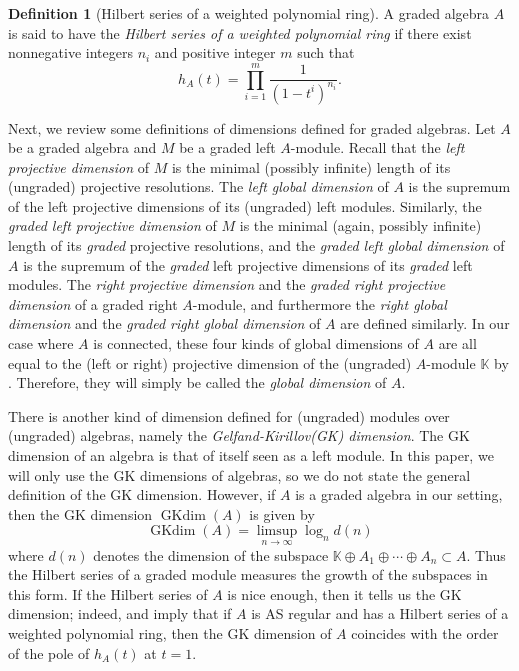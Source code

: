 \documentclass[reqno]{amsart}
\newcommand{\bbK}{\mathbb{K}}
\DeclareMathOperator{\gk}{GKdim}
\numberwithin{equation}{section}
\theoremstyle{plain}
\theoremstyle{definition}
\newtheorem{de}[equation]{Definition}
\begin{document}
\begin{de}[Hilbert series of a weighted polynomial ring]\label{weighted}\cite[Definition 2.3]{Kabbaj}
    A graded algebra $A$ is said to have the \emph{Hilbert series of a weighted polynomial ring} if there exist nonnegative integers $n_i$ and positive integer $m$ such that
    $$h_A(t)=\prod_{i=1}^m\frac{1}{(1-t^i)^{n_i}}.$$
\end{de}

Next, we review some definitions of dimensions defined for graded algebras. Let $A$ be a graded algebra and $M$ be a graded left $A$-module. Recall that the \emph{left projective dimension} of $M$ is the minimal (possibly infinite) length of its (ungraded) projective resolutions. The \emph{left global dimension} of $A$ is the supremum of the left projective dimensions of its (ungraded) left modules. Similarly, the \emph{graded left projective dimension} of $M$ is the minimal (again, possibly infinite) length of its \emph{graded} projective resolutions, and the \emph{graded left global dimension} of $A$ is the supremum of the \emph{graded} left projective dimensions of its \emph {graded} left modules. The \emph{right projective dimension} and the \emph{graded right projective dimension} of a graded right $A$-module, and furthermore the \emph{right global dimension} and the \emph{graded right global dimension} of $A$ are defined similarly. In our case where $A$ is connected, these four kinds of global dimensions of $A$ are all equal to the (left or right) projective dimension of the (ungraded) $A$-module $\bbK$ by \cite[Proposition 3.18(3)]{ReyesRogalski}. Therefore, they will simply be called the \emph{global dimension} of $A$.

There is another kind of dimension defined for (ungraded) modules over (ungraded) algebras, namely the \emph{Gelfand-Kirillov(GK) dimension}. The GK dimension of an algebra is that of itself seen as a left module. In this paper, we will only use the GK dimensions of algebras, so we do not state the general definition of the GK dimension. However, if $A$ is a graded algebra in our setting, then the GK dimension $\gk(A)$ is given by
$$\gk(A)=\limsup_{n\rightarrow\infty}\log_nd(n)$$
where $d(n)$ denotes the dimension of the subspace $\bbK\oplus A_1\oplus\cdots\oplus A_n\subset A$. Thus the Hilbert series of a graded module measures the growth of the subspaces in this form. 
If the Hilbert series of $A$ is nice enough, then it tells us the GK dimension; indeed, \cite[Proposition 2.21]{ArtinTateVandenBergh} and \cite[Corollary 2.2]{StephensonZhang} imply that if $A$ is AS regular and has a Hilbert series of a weighted polynomial ring, then the GK dimension of $A$ coincides with the order of the pole of $h_A(t)$ at $t=1$.
\end{document}
